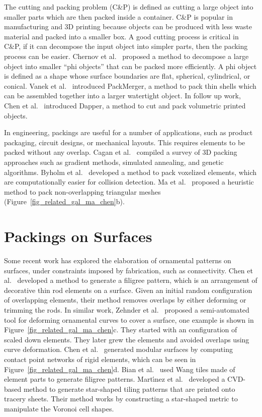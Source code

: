 \newtext
{
The cutting and packing problem (C\&P) is defined as cutting a large object into smaller parts 
which are then packed inside a container.
C\&P is popular in manufacturing and 3D printing because
objects can be produced with less waste material and packed into a smaller box.
A good cutting process is critical in C\&P, if it can decompose the input object
into simpler parts, then the packing process can be easier.
Chernov et al.~\cite{Chernov2010} proposed a method to decompose a large object
into smaller ``phi objects'' that can be packed more efficiently.
A phi object is defined as a shape whose surface boundaries 
are flat, spherical, cylindrical, or conical.
Vanek et al.~\cite{Vanek2014} introduced PackMerger,
a method to pack thin shells which can be assembled together into
a larger watertight object.
In follow up work, Chen et al.~\cite{Chen2015} introduced Dapper,
a method to cut and pack volumetric printed objects.
}

\newtext
{
In engineering, packings are useful for a number of applications, 
such as product packaging, circuit designs, or mechanical layouts.
This requires elements to be packed without any overlap.
Cagan et al.~\cite{Cagan2002} compiled a survey of 3D packing approaches such as
gradient methods, simulated annealing, and genetic algorithms.
Byholm et al.~\cite{Byholm2009} developed a method
to pack voxelized elements, which are computationally easier for collision detection.
Ma et al.~\cite{Ma2018} proposed a heuristic method to pack non-overlapping triangular meshes 
(Figure~\ref{fig_related_gal_ma_chen}b).
}



\section{Packings on Surfaces}

Some recent work has explored the elaboration of ornamental
patterns on surfaces, under constraints imposed by fabrication, such as connectivity.  
Chen et al.~\cite{Chen2016} developed a method to generate a filigree pattern,
which is an arrangement of decorative thin rod elements on a surface.
Given an initial random configuration of overlapping elements, their method
removes overlaps by either deforming or trimming the rods.
In similar work, Zehnder et al.~\cite{Zehnder2016} 
proposed a semi-automated tool for deforming ornamental curves to cover a surface, one example is shown in 
Figure~\ref{fig_related_gal_ma_chen}c. 
They started with an  configuration of scaled down elements. 
They later grew the elements and avoided overlaps using curve deformation.
Chen et al.~\cite{Chen2017} generated modular surfaces by
computing contact point networks of rigid elements, which can be seen in Figure~\ref{fig_related_gal_ma_chen}d.
Bian et al.~\cite{Bian2018} used Wang tiles made of element parts to generate filigree patterns.
Mart\'{\i}nez et al.~\cite{Martinez2019} developed a CVD-based method to generate
star-shaped tiling patterns that are printed onto tracery sheets.
Their method works by constructing a star-shaped metric to manipulate the Voronoi cell shapes. 

